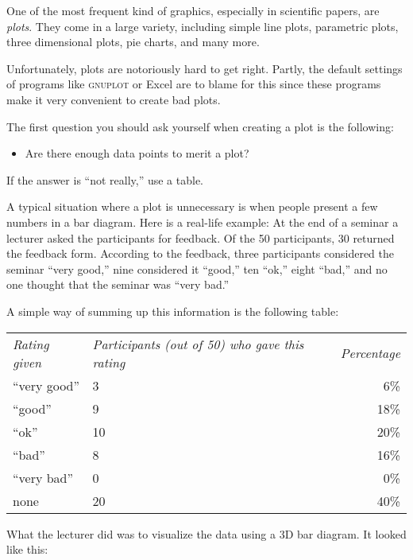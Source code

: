 One of the most frequent kind of graphics, especially in scientific
papers, are \emph{plots}. They come in a large variety, including
simple line plots, parametric plots, three dimensional plots, pie
charts, and many more.

Unfortunately, plots are notoriously hard to get right. Partly, the
default settings of programs like \textsc{gnuplot} or Excel are to
blame for this since these programs make it very convenient to create
bad plots.

The first question you should ask yourself when creating a plot is the
following:
\begin{itemize}
\item
  Are there enough data points to merit a plot?
\end{itemize}

If the answer is ``not really,'' use a table.

A typical situation where a plot is unnecessary is when people present
a few numbers in a bar diagram. Here is a real-life example: At the
end of a seminar a lecturer asked the participants for feedback. Of
the 50 participants, 30 returned the feedback form. According to the
feedback, three participants considered the seminar ``very good,''
nine considered it  ``good,'' ten ``ok,'' eight ``bad,'' and no one thought 
that the seminar was ``very bad.''

A simple way of summing up this information is the following table:

\medskip
\begin{tabular}{lp{3.75cm}r}
  \emph{Rating given} & \raggedright\emph{Participants (out of 50) who gave this rating} &
  \emph{Percentage} \\[1.75em]
  ``very good'' & \hfil\hphantom{0}3\hfil & \hphantom{0}6\% \\
  ``good'' & \hfil\hphantom{0}9\hfil & 18\% \\
  ``ok'' & \hfil10\hfil & 20\% \\
  ``bad'' & \hfil\hphantom{0}8\hfil & 16\% \\
  ``very bad'' & \hfil\hphantom{0}0\hfil & \hphantom{0}0\% \\[2mm]
  none & \hfil20\hfil & 40\% \\
\end{tabular}

\bigskip
What the lecturer did was to visualize the data using a 3D bar
diagram. It looked like this:

